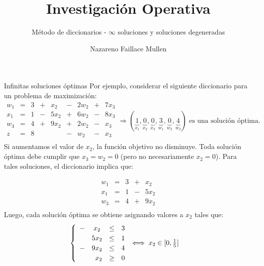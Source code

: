\documentclass[10pt, aspectratio=169]{beamer}
\title{Investigación Operativa}
\subtitle{Método de diccionarios - $\infty$ soluciones y soluciones degeneradas}
\date{}
\author{Nazareno Faillace Mullen}
\institute{Departamento de Matemática - FCEN - UBA}
\begin{document}
\maketitle


\begin{frame}{Infinitas soluciones óptimas}
    \small
    Por ejemplo, considerar el siguiente diccionario para un problema de maximización:
    \[
        \begin{array}{ccccccccc}
            w_1 & = & 3 & + & x_2  & - & 2w_2 & + & 7x_3 \\
            x_1 & = & 1 & - & 5x_2 & + & 6w_2 & - & 8x_3 \\
            w_3 & = & 4 & + & 9x_2 & + & 2w_2 & - & x_3  \\ \hline
            z   & = & 8 &   &      & - & w_2  & - & x_3  \\
        \end{array}
        \Rightarrow
        (\underbrace{1}_{x_1},\underbrace{0}_{x_2},\underbrace{0}_{x_3},\underbrace{3}_{w_1},\underbrace{0}_{w_2},
        \underbrace{4}_{w_3}) \text{ es una solución óptima.}
    \]
    Si aumentamos el valor de $x_2$, la función objetivo no disminuye. Toda solución óptima debe cumplir que
    $x_3=w_2=0$ (pero no necesariamente
    $x_2=0$). Para tales soluciones, el diccionario implica que:

    \[
        \begin{array}{ccccc}
            w_1 & = & 3 & + & x_2  \\
            x_1 & = & 1 & - & 5x_2 \\
            w_3 & = & 4 & + & 9x_2 \\
        \end{array}
    \]
    Luego, cada solución óptima se obtiene asignando valores a $x_2$ tales que:
    \[  \begin{cases}
            \begin{array}{cccc}
                - & x_2  & \leq & 3 \\
                & 5x_2 & \leq & 1 \\
                - & 9x_2 & \leq & 4 \\
                \multicolumn{2}{r}{x_2} & \geq & 0
            \end{array}
            \iff x_2\in [0,\frac{1}{5}]
        \end{cases}
    \]

\end{frame}
\end{document}

